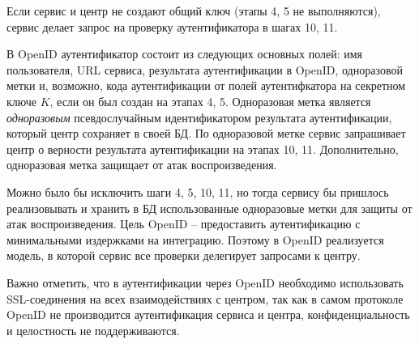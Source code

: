 Если сервис и центр не создают общий ключ (этапы 4, 5 не выполняются), сервис делает запрос на проверку аутентификатора в шагах 10, 11.

В OpenID аутентификатор состоит из следующих основных полей: имя пользователя, URL сервиса, результата аутентификации в OpenID, одноразовой метки и, возможно, кода аутентификации от полей аутентифкатора на секретном ключе $K$, если он был создан на этапах 4, 5. Одноразовая метка является \emph{одноразовым} псевдослучайным идентификатором результата аутентификации, который центр сохраняет в своей БД. По одноразовой метке сервис запрашивает центр о верности результата аутентификации на этапах 10, 11. Дополнительно, одноразовая метка защищает от атак воспроизведения.

Можно было бы исключить шаги 4, 5, 10, 11, но тогда сервису бы пришлось реализовывать и хранить в БД использованные одноразовые метки для защиты от атак воспроизведения. Цель OpenID -- предоставить аутентификацию с минимальными издержками на интеграцию. Поэтому в OpenID реализуется модель, в которой сервис все проверки делегирует запросами к центру.

Важно отметить, что в аутентификации через OpenID необходимо использовать SSL-соединения на всех взаимодействиях с центром, так как в самом протоколе OpenID не производится аутентификация сервиса и центра, конфиденциальность и целостность не поддерживаются.
